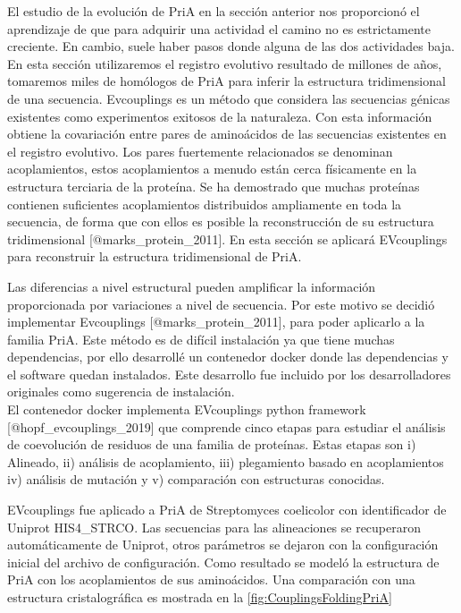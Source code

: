 \documentclass[]{article}
\begin{document}
{El estudio de la evolución de PriA en la sección anterior nos
proporcionó el aprendizaje de que para adquirir una actividad el camino
no es estrictamente creciente. En cambio, suele haber pasos donde alguna
de las dos actividades baja. En esta sección utilizaremos el registro
evolutivo resultado de millones de años, tomaremos miles de homólogos de
PriA para inferir la estructura tridimensional de una secuencia.
Evcouplings es un método que considera las secuencias génicas existentes
como experimentos exitosos de la naturaleza. Con esta información
obtiene la covariación entre pares de aminoácidos de las secuencias
existentes en el registro evolutivo. Los pares fuertemente relacionados
se denominan acoplamientos, estos acoplamientos a menudo están cerca
físicamente en la estructura terciaria de la proteína. Se ha demostrado
que muchas proteínas contienen suficientes acoplamientos distribuidos
ampliamente en toda la secuencia, de forma que con ellos es posible la
reconstrucción de su estructura tridimensional
{[}@marks\_protein\_2011{]}. En esta sección se aplicará EVcouplings
para reconstruir la estructura tridimensional de PriA.

Las diferencias a nivel estructural pueden amplificar la información
proporcionada por variaciones a nivel de secuencia. Por este motivo se
decidió implementar Evcouplings {[}@marks\_protein\_2011{]}, para poder
aplicarlo a la familia PriA. Este método es de difícil instalación ya
que tiene muchas dependencias, por ello desarrollé un contenedor docker
donde las dependencias y el software quedan instalados. Este desarrollo
fue incluido por los desarrolladores originales como sugerencia de
instalación.\\
El contenedor docker implementa EVcouplings python framework
{[}@hopf\_evcouplings\_2019{]} que comprende cinco etapas para estudiar
el análisis de coevolución de residuos de una familia de proteínas.
Estas etapas son i) Alineado, ii) análisis de acoplamiento, iii)
plegamiento basado en acoplamientos iv) análisis de mutación y v)
comparación con estructuras conocidas.

EVcouplings fue aplicado a PriA de Streptomyces coelicolor con
identificador de Uniprot HIS4\_STRCO. Las secuencias para las
alineaciones se recuperaron automáticamente de Uniprot, otros parámetros
se dejaron con la configuración inicial del archivo de configuración.
Como resultado se modeló la estructura de PriA con los acoplamientos de
sus aminoácidos. Una comparación con una estructura cristalográfica es
mostrada en la \autoref{fig:CouplingsFoldingPriA}

}
\end{document}
